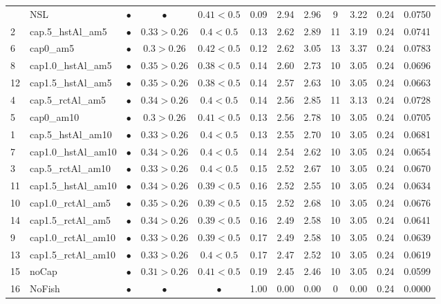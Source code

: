 \documentclass[11pt]{book}
\begin{document}
\begin{landscape}
\begin{longtable}[t]{llcccccccccc}
\midrule
\endhead
\
\endfoot
\bottomrule
\endlastfoot
17 & NSL & $\bullet$ & $\bullet$ & $0.41<0.5$ & 0.09 & 2.94 & 2.96 & 9 & 3.22 & 0.24 & 0.0750\\
2 & cap.5\_hstAl\_am5 & $\bullet$ & $0.33>0.26$ & $0.4<0.5$ & 0.13 & 2.62 & 2.89 & 11 & 3.19 & 0.24 & 0.0741\\
6 & cap0\_am5 & $\bullet$ & $0.3>0.26$ & $0.42<0.5$ & 0.12 & 2.62 & 3.05 & 13 & 3.37 & 0.24 & 0.0783\\
8 & cap1.0\_hstAl\_am5 & $\bullet$ & $0.35>0.26$ & $0.38<0.5$ & 0.14 & 2.60 & 2.73 & 10 & 3.05 & 0.24 & 0.0696\\
12 & cap1.5\_hstAl\_am5 & $\bullet$ & $0.35>0.26$ & $0.38<0.5$ & 0.14 & 2.57 & 2.63 & 10 & 3.05 & 0.24 & 0.0663\\
4 & cap.5\_rctAl\_am5 & $\bullet$ & $0.34>0.26$ & $0.4<0.5$ & 0.14 & 2.56 & 2.85 & 11 & 3.13 & 0.24 & 0.0728\\
5 & cap0\_am10 & $\bullet$ & $0.3>0.26$ & $0.41<0.5$ & 0.13 & 2.56 & 2.78 & 10 & 3.05 & 0.24 & 0.0705\\
1 & cap.5\_hstAl\_am10 & $\bullet$ & $0.33>0.26$ & $0.4<0.5$ & 0.13 & 2.55 & 2.70 & 10 & 3.05 & 0.24 & 0.0681\\
7 & cap1.0\_hstAl\_am10 & $\bullet$ & $0.34>0.26$ & $0.4<0.5$ & 0.14 & 2.54 & 2.62 & 10 & 3.05 & 0.24 & 0.0654\\
3 & cap.5\_rctAl\_am10 & $\bullet$ & $0.33>0.26$ & $0.4<0.5$ & 0.15 & 2.52 & 2.67 & 10 & 3.05 & 0.24 & 0.0670\\
11 & cap1.5\_hstAl\_am10 & $\bullet$ & $0.34>0.26$ & $0.39<0.5$ & 0.16 & 2.52 & 2.55 & 10 & 3.05 & 0.24 & 0.0634\\
10 & cap1.0\_rctAl\_am5 & $\bullet$ & $0.35>0.26$ & $0.39<0.5$ & 0.15 & 2.52 & 2.68 & 10 & 3.05 & 0.24 & 0.0676\\
14 & cap1.5\_rctAl\_am5 & $\bullet$ & $0.34>0.26$ & $0.39<0.5$ & 0.16 & 2.49 & 2.58 & 10 & 3.05 & 0.24 & 0.0641\\
9 & cap1.0\_rctAl\_am10 & $\bullet$ & $0.33>0.26$ & $0.39<0.5$ & 0.17 & 2.49 & 2.58 & 10 & 3.05 & 0.24 & 0.0639\\
13 & cap1.5\_rctAl\_am10 & $\bullet$ & $0.33>0.26$ & $0.4<0.5$ & 0.17 & 2.47 & 2.52 & 10 & 3.05 & 0.24 & 0.0619\\
15 & noCap & $\bullet$ & $0.31>0.26$ & $0.41<0.5$ & 0.19 & 2.45 & 2.46 & 10 & 3.05 & 0.24 & 0.0599\\
16 & NoFish & $\bullet$ & $\bullet$ & $\bullet$ & 1.00 & 0.00 & 0.00 & 0 & 0.00 & 0.24 & 0.0000\\*
\end{longtable}
\endgroup{}
\end{landscape}
\endgroup{}
\end{document}

